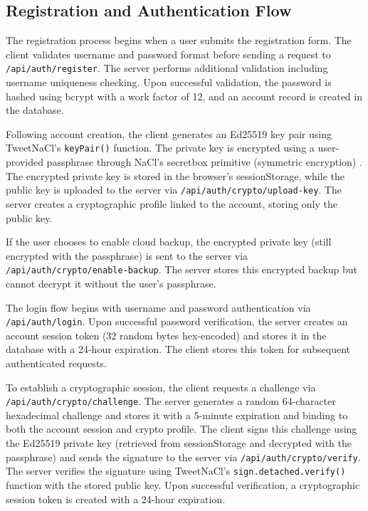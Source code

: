 \documentclass[12pt,a4paper,openany]{book}
\begin{document}
\subsection{Registration and Authentication Flow}

The registration process begins when a user submits the registration form. The client validates username and password format before sending a request to \texttt{/api/auth/}\allowbreak\texttt{register}. The server performs additional validation including username uniqueness checking. Upon successful validation, the password is hashed using bcrypt \cite{bcrypt} with a work factor of 12, and an account record is created in the database.

Following account creation, the client generates an Ed25519 key pair \cite{rfc8032} using TweetNaCl's \cite{tweetnacl} \texttt{keyPair()} function. The private key is encrypted using a user-provided passphrase through NaCl's secretbox primitive (symmetric encryption) \cite{nacl}. The encrypted private key is stored in the browser's sessionStorage, while the public key is uploaded to the server via \texttt{/api/auth/crypto/}\allowbreak\texttt{upload-key}. The server creates a cryptographic profile linked to the account, storing only the public key.

If the user chooses to enable cloud backup, the encrypted private key (still encrypted with the passphrase) is sent to the server via \texttt{/api/auth/crypto/}\allowbreak\texttt{enable-backup}. The server stores this encrypted backup but cannot decrypt it without the user's passphrase.

The login flow begins with username and password authentication via \texttt{/api/auth/}\allowbreak\texttt{login}. Upon successful password verification, the server creates an account session token (32 random bytes hex-encoded) and stores it in the database with a 24-hour expiration. The client stores this token for subsequent authenticated requests.

To establish a cryptographic session, the client requests a challenge via \texttt{/api/auth/crypto/}\allowbreak\texttt{challenge}. The server generates a random 64-character hexadecimal challenge and stores it with a 5-minute expiration and binding to both the account session and crypto profile. The client signs this challenge using the Ed25519 private key (retrieved from sessionStorage and decrypted with the passphrase) and sends the signature to the server via \texttt{/api/auth/crypto/}\allowbreak\texttt{verify}. The server verifies the signature using TweetNaCl's \cite{tweetnacl} \texttt{sign.detached.}\allowbreak\texttt{verify()} function with the stored public key. Upon successful verification, a cryptographic session token is created with a 24-hour expiration.
\end{document}
